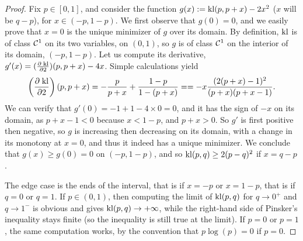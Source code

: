 \begin{proof}
    Fix $p\in[0,1]$, and consider the function $g(x) := \mathrm{kl}(p, p+x) - 2 x^2$ ($x$ will be $q-p$), for $x\in(-p, 1-p)$.
    We first observe that $g(0) = 0$, and we easily prove that $x=0$ is the unique minimizer of $g$ over its domain.
    By definition, $\mathrm{kl}$ is of class $\mathcal{C}^1$ on its two variables, on $(0,1)$, so $g$ is of class $\mathcal{C}^1$ on the interior of its domain, $(-p, 1-p)$.
    Let us compute its derivative, $g'(x) = (\frac{\partial \; \mathrm{kl}}{\partial 2})(p, p + x) - 4x$.
    Simple calculations yield
    \[ \left(\frac{\partial \; \mathrm{kl}}{\partial 2}\right) (p, p + x) = - \frac{p}{p+x} + \frac{1-p}{1-(p+x)} =  = -x \frac{(2(p + x) - 1)^2}{(p + x)(p + x - 1)}. \]
    We can verify that $g'(0) = -1 + 1 - 4 \times 0 = 0$, and it has the sign of $-x$ on its domain, as $p + x - 1 < 0$ because $x < 1 - p$, and $p + x > 0$.
    So $g'$ is first positive then negative, so $g$ is increasing then decreasing on its domain, with a change in its monotony at $x=0$, and thus it indeed has a unique minimizer.
    We conclude that $g(x) \geq g(0) = 0$ on $(-p, 1-p)$, and so $\mathrm{kl}(p,q) \geq 2 (p-q)^2$ if $x = q-p$.

    The edge case is the ends of the interval, that is if $x=-p$ or $x=1-p$, that is if $q=0$ or $q=1$.
    If $p\in(0,1)$, then computing the limit of $\mathrm{kl}(p,q)$ for $q\to0^+$ and $q\to1^-$ is obvious and gives $\mathrm{kl}(p,q) \to +\infty$, while the right-hand side of Pinsker's inequality stays finite (so the inequality is still true at the limit).
    If $p=0$ or $p=1$, the same computation works, by the convention that $p \log(p) = 0$ if $p=0$.
\end{proof}


